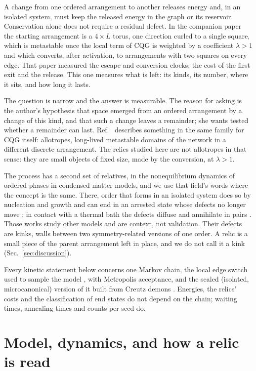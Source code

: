\documentclass[aps,pre,10pt,twocolumn,superscriptaddress,nofootinbib]{revtex4-2}
\begin{document}
A change from one ordered arrangement to another releases energy and, in an isolated system, must keep the
released energy in the graph or its reservoir. Conservation alone does not require a residual defect. In the
companion paper \cite{paper1} the starting arrangement is a $4 \times L$ torus, one direction curled to a single
square, which is metastable once the local term of CQG \cite{T17,KTB19,T25} is weighted by a coefficient
$\lambda > 1$ and which converts, after activation, to arrangements with two squares on every edge. That paper
measured the escape and conversion clocks, the cost of the first exit and the release. This one measures what
is left: its kinds, its number, where it sits, and how long it lasts.

The question is narrow and the answer is measurable. The reason for asking is the author's hypothesis that
space emerged from an ordered arrangement by a change of this kind, and that such a change leaves a remainder;
she wants tested whether a remainder can last. Ref.~\cite{T24} describes something in the same family for CQG
itself: allotropes, long-lived metastable domains of the network in a different discrete arrangement. The
relics studied here are not allotropes in that sense: they are small objects of fixed size, made by the
conversion, at $\lambda > 1$.

The process has a second set of relatives, in the nonequilibrium dynamics of ordered phases in condensed-matter
models, and we use that field's words where the concept is the same. There, order that forms in an isolated
system does so by nucleation and growth and can end in an arrested state whose defects no longer move
\cite{JC26}; in contact with a thermal bath the defects diffuse and annihilate in pairs \cite{JYC25}. Those
works study other models and are context, not validation. Their defects are kinks, walls between two
symmetry-related versions of one order. A relic is a small piece of the parent arrangement left in place, and
we do not call it a kink (Sec.~\ref{sec:discussion}).

Every kinetic statement below concerns one Markov chain, the local edge switch used to sample the model
\cite{KTB19}, with Metropolis acceptance, and the sealed (isolated, microcanonical) version of it built from
Creutz demons \cite{Creutz83}. Energies, the relics' costs and the classification of end states do not depend
on the chain; waiting times, annealing times and counts per seed do.

\section{Model, dynamics, and how a relic is read}
\label{sec:model}
\end{document}
